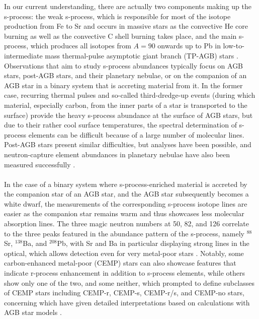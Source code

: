 \documentclass[a4paper,11pt]{article}
\begin{document}
In our current understanding, there are actually two components making up the s-process: the weak s-process, which is responsible for most of the isotope production from Fe to Sr and occurs in massive stars as the convective He core burning as well as the convective C shell burning takes place, and the main s-process, which produces all isotopes from $A=90$ onwards up to Pb in low-to-intermediate mass thermal-pulse asymptotic giant branch (TP-AGB) stars \citep{kappeler11}. Observations that aim to study s-process abundances typically focus on AGB stars, post-AGB stars, and their planetary nebulae, or on the companion of an AGB star in a binary system that is accreting material from it. In the former case, recurring thermal pulses and so-called third-dredge-up events (during which material, especially carbon, from the inner parts of a star is transported to the surface) provide the heavy s-process abundance at the surface of AGB stars, but due to their rather cool surface temperatures, the spectral determination of s-process elements can be difficult because of a large number of molecular lines. Post-AGB stars present similar difficulties, but analyses have been possible, and neutron-capture element abundances in planetary nebulae have also been measured successfully \citep{sterling08,sharpee07}.\\ \\
%
In the case of a binary system where s-process-enriched material is accreted by the companion star of an AGB star, and the AGB star subsequently becomes a white dwarf, the measurements of the corresponding s-process isotope lines are easier as the companion star remains warm and thus showcases less molecular absorption lines. The three magic neutron numbers at 50, 82, and 126 correlate to the three peaks featured in the abundance pattern of the s-process, namely $^{88}$Sr, $^{138}$Ba, and $^{208}$Pb, with Sr and Ba in particular displaying strong lines in the optical, which allows detection even for very metal-poor stars \citep{kappeler11}. Notably, some carbon-enhanced metal-poor (CEMP) stars can also showcase features that indicate r-process enhancement in addition to s-process elements, while others show only one of the two, and some neither, which prompted \citet{beers05} to define subclasses of CEMP stars including CEMP-r, CEMP-s, CEMP-r/s, and CEMP-no stars, concerning which \citet{bisterzo11} have given detailed interpretations based on calculations with AGB star models \citep{bisterzo10}.\\ \\
\end{document}
